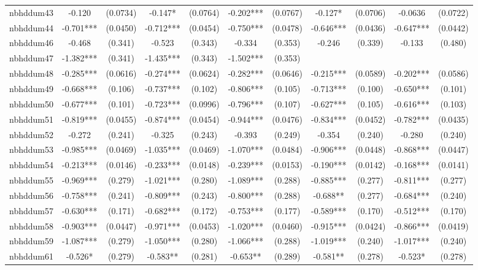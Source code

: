 \documentclass[]{article}
\begin{document}
\begin{tabular}{lcccccccccc}
nbhddum43 & -0.120 & (0.0734) & -0.147* & (0.0764) & -0.202*** & (0.0767) & -0.127* & (0.0706) & -0.0636 & (0.0722) \\
nbhddum44 & -0.701*** & (0.0450) & -0.712*** & (0.0454) & -0.750*** & (0.0478) & -0.646*** & (0.0436) & -0.647*** & (0.0442) \\
nbhddum46 & -0.468 & (0.341) & -0.523 & (0.343) & -0.334 & (0.353) & -0.246 & (0.339) & -0.133 & (0.480) \\
nbhddum47 & -1.382*** & (0.341) & -1.435*** & (0.343) & -1.502*** & (0.353) &  &  &  &  \\
nbhddum48 & -0.285*** & (0.0616) & -0.274*** & (0.0624) & -0.282*** & (0.0646) & -0.215*** & (0.0589) & -0.202*** & (0.0586) \\
nbhddum49 & -0.668*** & (0.106) & -0.737*** & (0.102) & -0.806*** & (0.105) & -0.713*** & (0.100) & -0.650*** & (0.101) \\
nbhddum50 & -0.677*** & (0.101) & -0.723*** & (0.0996) & -0.796*** & (0.107) & -0.627*** & (0.105) & -0.616*** & (0.103) \\
nbhddum51 & -0.819*** & (0.0455) & -0.874*** & (0.0454) & -0.944*** & (0.0476) & -0.834*** & (0.0452) & -0.782*** & (0.0435) \\
nbhddum52 & -0.272 & (0.241) & -0.325 & (0.243) & -0.393 & (0.249) & -0.354 & (0.240) & -0.280 & (0.240) \\
nbhddum53 & -0.985*** & (0.0469) & -1.035*** & (0.0469) & -1.070*** & (0.0484) & -0.906*** & (0.0448) & -0.868*** & (0.0447) \\
nbhddum54 & -0.213*** & (0.0146) & -0.233*** & (0.0148) & -0.239*** & (0.0153) & -0.190*** & (0.0142) & -0.168*** & (0.0141) \\
nbhddum55 & -0.969*** & (0.279) & -1.021*** & (0.280) & -1.089*** & (0.288) & -0.885*** & (0.277) & -0.811*** & (0.277) \\
nbhddum56 & -0.758*** & (0.241) & -0.809*** & (0.243) & -0.800*** & (0.288) & -0.688** & (0.277) & -0.684*** & (0.240) \\
nbhddum57 & -0.630*** & (0.171) & -0.682*** & (0.172) & -0.753*** & (0.177) & -0.589*** & (0.170) & -0.512*** & (0.170) \\
nbhddum58 & -0.903*** & (0.0447) & -0.971*** & (0.0453) & -1.020*** & (0.0460) & -0.915*** & (0.0424) & -0.866*** & (0.0419) \\
nbhddum59 & -1.087*** & (0.279) & -1.050*** & (0.280) & -1.066*** & (0.288) & -1.019*** & (0.240) & -1.017*** & (0.240) \\
nbhddum61 & -0.526* & (0.279) & -0.583** & (0.281) & -0.653** & (0.289) & -0.581** & (0.278) & -0.523* & (0.278) \\

\end{tabular}
\end{document}
